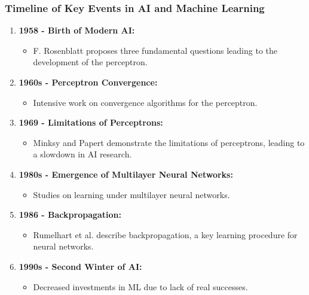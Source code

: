 \begin{frame}
    \frametitle{Timeline of Key Events in AI and Machine Learning}
    \begin{enumerate}
        \item \textbf{1958 - Birth of Modern AI:}
              \begin{itemize}
                  \item F. Rosenblatt proposes three fundamental questions leading to the development of the perceptron.
              \end{itemize}

        \item \textbf{1960s - Perceptron Convergence:}
              \begin{itemize}
                  \item Intensive work on convergence algorithms for the perceptron.
              \end{itemize}

        \item \textbf{1969 - Limitations of Perceptrons:}
              \begin{itemize}
                  \item Minksy and Papert demonstrate the limitations of perceptrons, leading to a slowdown in AI research.
              \end{itemize}

        \item \textbf{1980s - Emergence of Multilayer Neural Networks:}
              \begin{itemize}
                  \item Studies on learning under multilayer neural networks.
              \end{itemize}

        \item \textbf{1986 - Backpropagation:}
              \begin{itemize}
                  \item Rumelhart et al. describe backpropagation, a key learning procedure for neural networks.
              \end{itemize}

        \item \textbf{1990s - Second Winter of AI:}
              \begin{itemize}
                  \item Decreased investments in ML due to lack of real successes.
              \end{itemize}


\end{enumerate}
\end{frame}

